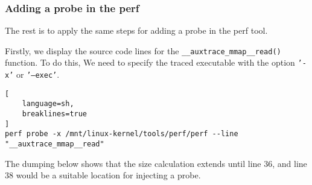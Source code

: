 \documentclass[11pt]{diazessay} %
\def\code#1{\texttt{#1}}
\begin{document}
\subsubsection*{Adding a probe in the perf}

The rest is to apply the same steps for adding a probe in the perf tool.

Firstly, we display the source code lines for the
\code{\_\_auxtrace\_mmap\_\_read()} function. To do this, We need to specify
the traced executable with the option \code{'-x'} or \code{'---exec'}.

\begin{lstlisting}[
  	language=sh,
	breaklines=true
]
perf probe -x /mnt/linux-kernel/tools/perf/perf --line "__auxtrace_mmap__read"
\end{lstlisting}

The dumping below shows that the size calculation extends until line 36, and
line 38 would be a suitable location for injecting a probe.
\end{document}
